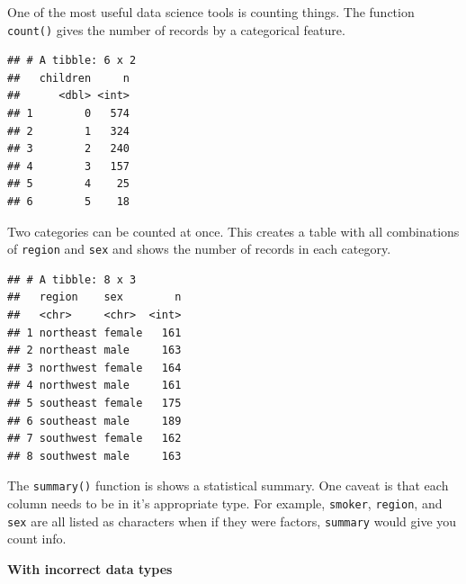 \documentclass[openany]{book}
\newenvironment{Shaded}{\begin{snugshade}}{\end{snugshade}}
\newcommand{\KeywordTok}[1]{\textcolor[rgb]{0.13,0.29,0.53}{\textbf{#1}}}
\newcommand{\NormalTok}[1]{#1}
\newcommand{\OperatorTok}[1]{\textcolor[rgb]{0.81,0.36,0.00}{\textbf{#1}}}
\newcommand{\StringTok}[1]{\textcolor[rgb]{0.31,0.60,0.02}{#1}}
\begin{document}
One of the most useful data science tools is counting things. The function \texttt{count()} gives the number of records by a categorical feature.

\begin{Shaded}
\end{Shaded}

\begin{verbatim}
## # A tibble: 6 x 2
##   children     n
##      <dbl> <int>
## 1        0   574
## 2        1   324
## 3        2   240
## 4        3   157
## 5        4    25
## 6        5    18
\end{verbatim}

Two categories can be counted at once. This creates a table with all combinations of \texttt{region} and \texttt{sex} and shows the number of records in each category.

\begin{Shaded}
\end{Shaded}

\begin{verbatim}
## # A tibble: 8 x 3
##   region    sex        n
##   <chr>     <chr>  <int>
## 1 northeast female   161
## 2 northeast male     163
## 3 northwest female   164
## 4 northwest male     161
## 5 southeast female   175
## 6 southeast male     189
## 7 southwest female   162
## 8 southwest male     163
\end{verbatim}

The \texttt{summary()} function is shows a statistical summary. One caveat is that each column needs to be in it's appropriate type. For example, \texttt{smoker}, \texttt{region}, and \texttt{sex} are all listed as characters when if they were factors, \texttt{summary} would give you count info.

\textbf{With incorrect data types}

\begin{Shaded}
\end{Shaded}
\end{document}
